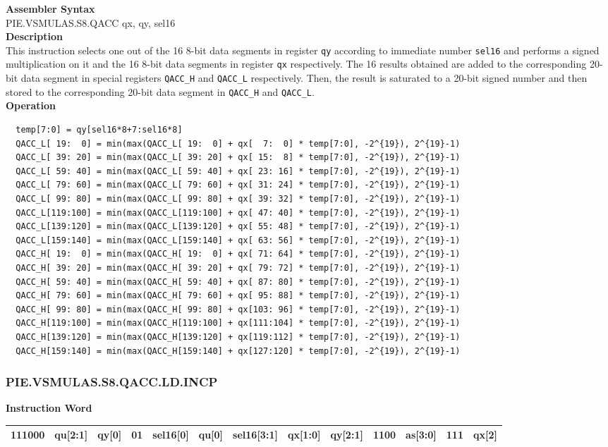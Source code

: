 \textbf{Assembler Syntax} \\
PIE.VSMULAS.S8.QACC qx, qy, sel16 \\
\textbf{Description} \\
This instruction selects one out of the 16 8-bit data segments in register \lstinline{qy} according to immediate number \lstinline{sel16} and performs a signed multiplication on it and the 16 8-bit data segments in register \lstinline{qx} respectively. The 16 results obtained are added to the corresponding 20-bit data segment in special registers \lstinline{QACC_H} and \lstinline{QACC_L} respectively. Then, the result is saturated to a 20-bit signed number and then stored to the corresponding 20-bit data segment in \lstinline{QACC_H} and \lstinline{QACC_L}.\\
\textbf{Operation}
\begin{lstlisting}
  temp[7:0] = qy[sel16*8+7:sel16*8]
  QACC_L[ 19:  0] = min(max(QACC_L[ 19:  0] + qx[  7:  0] * temp[7:0], -2^{19}), 2^{19}-1)
  QACC_L[ 39: 20] = min(max(QACC_L[ 39: 20] + qx[ 15:  8] * temp[7:0], -2^{19}), 2^{19}-1)
  QACC_L[ 59: 40] = min(max(QACC_L[ 59: 40] + qx[ 23: 16] * temp[7:0], -2^{19}), 2^{19}-1)
  QACC_L[ 79: 60] = min(max(QACC_L[ 79: 60] + qx[ 31: 24] * temp[7:0], -2^{19}), 2^{19}-1)
  QACC_L[ 99: 80] = min(max(QACC_L[ 99: 80] + qx[ 39: 32] * temp[7:0], -2^{19}), 2^{19}-1)
  QACC_L[119:100] = min(max(QACC_L[119:100] + qx[ 47: 40] * temp[7:0], -2^{19}), 2^{19}-1)
  QACC_L[139:120] = min(max(QACC_L[139:120] + qx[ 55: 48] * temp[7:0], -2^{19}), 2^{19}-1)
  QACC_L[159:140] = min(max(QACC_L[159:140] + qx[ 63: 56] * temp[7:0], -2^{19}), 2^{19}-1)
  QACC_H[ 19:  0] = min(max(QACC_H[ 19:  0] + qx[ 71: 64] * temp[7:0], -2^{19}), 2^{19}-1)
  QACC_H[ 39: 20] = min(max(QACC_H[ 39: 20] + qx[ 79: 72] * temp[7:0], -2^{19}), 2^{19}-1)
  QACC_H[ 59: 40] = min(max(QACC_H[ 59: 40] + qx[ 87: 80] * temp[7:0], -2^{19}), 2^{19}-1)
  QACC_H[ 79: 60] = min(max(QACC_H[ 79: 60] + qx[ 95: 88] * temp[7:0], -2^{19}), 2^{19}-1)
  QACC_H[ 99: 80] = min(max(QACC_H[ 99: 80] + qx[103: 96] * temp[7:0], -2^{19}), 2^{19}-1)
  QACC_H[119:100] = min(max(QACC_H[119:100] + qx[111:104] * temp[7:0], -2^{19}), 2^{19}-1)
  QACC_H[139:120] = min(max(QACC_H[139:120] + qx[119:112] * temp[7:0], -2^{19}), 2^{19}-1)
  QACC_H[159:140] = min(max(QACC_H[159:140] + qx[127:120] * temp[7:0], -2^{19}), 2^{19}-1)
\end{lstlisting}

\newpage
\subsubsection{PIE.VSMULAS.S8.QACC.LD.INCP}\label{instruction:PIEVSMULASS8QACCLDINCP}
\setlength\tabcolsep{6pt}
\textbf{Instruction Word} \\
\begin{tabular}{|c|c|c|c|c|c|c|c|c|c|c|c|c|}
	\hline
	111000 & qu[2:1] & qy[0] & 01 & sel16[0] & qu[0] & sel16[3:1] & qx[1:0] & qy[2:1] & 1100 & as[3:0] & 111 & qx[2] \\
	\hline
\end{tabular}

